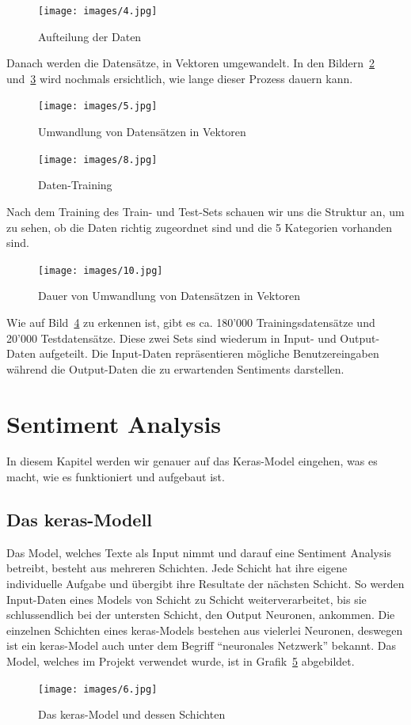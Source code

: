 \begin{figure}[ht!]
\centering
\texttt{[image: images/4.jpg]}
\caption{Aufteilung der Daten}
\label{fig:fig_04}
\end{figure}
\FloatBarrier

Danach werden die Datensätze, in Vektoren umgewandelt. In den Bildern~\ref{fig:fig_05} und~\ref{fig:fig_06} wird nochmals ersichtlich, wie lange dieser Prozess dauern kann.
\begin{figure}[ht!]
\centering
\texttt{[image: images/5.jpg]}
\caption{Umwandlung von Datensätzen in Vektoren}
\label{fig:fig_05}
\end{figure}
\FloatBarrier

\begin{figure}[ht!]
\centering
\texttt{[image: images/8.jpg]}
\caption{Daten-Training}
\label{fig:fig_06}
\end{figure}
\FloatBarrier

Nach dem Training des Train- und Test-Sets schauen wir uns die Struktur an, um zu sehen, ob die Daten richtig zugeordnet sind und die 5 Kategorien vorhanden sind.

\begin{figure}[ht!]
\centering
\texttt{[image: images/10.jpg]}
\caption{Dauer von Umwandlung von Datensätzen in Vektoren}
\label{fig:fig_07}
\end{figure}
\FloatBarrier

Wie auf Bild~\ref{fig:fig_07} zu erkennen ist, gibt es ca. 180'000 Trainingsdatensätze und 20'000 Testdatensätze. Diese zwei Sets sind wiederum in Input- und Output-Daten aufgeteilt. Die Input-Daten repräsentieren mögliche Benutzereingaben während die Output-Daten die zu erwartenden Sentiments darstellen.

\newpage
\section{Sentiment Analysis}
In diesem Kapitel werden wir genauer auf das Keras-Model eingehen, was es macht, wie es funktioniert und aufgebaut ist.
\subsection{Das \gls{keras}-Modell}
Das Model, welches Texte als Input nimmt und darauf eine Sentiment Analysis betreibt, besteht aus mehreren Schichten. Jede Schicht hat ihre eigene individuelle Aufgabe und übergibt ihre Resultate der nächsten Schicht. So werden Input-Daten eines Models von Schicht zu Schicht weiterverarbeitet, bis sie schlussendlich bei der untersten Schicht, den Output Neuronen, ankommen. Die einzelnen Schichten eines \gls{keras}-Models bestehen aus vielerlei Neuronen, deswegen ist ein \gls{keras}-Model auch unter dem Begriff “neuronales Netzwerk” bekannt. Das Model, welches im Projekt verwendet wurde, ist in Grafik~\ref{fig:fig_08} abgebildet.
\begin{figure}[ht!]
\centering
\texttt{[image: images/6.jpg]}
\caption{Das \gls{keras}-Model und dessen Schichten}
\label{fig:fig_08}
\end{figure}
\FloatBarrier

